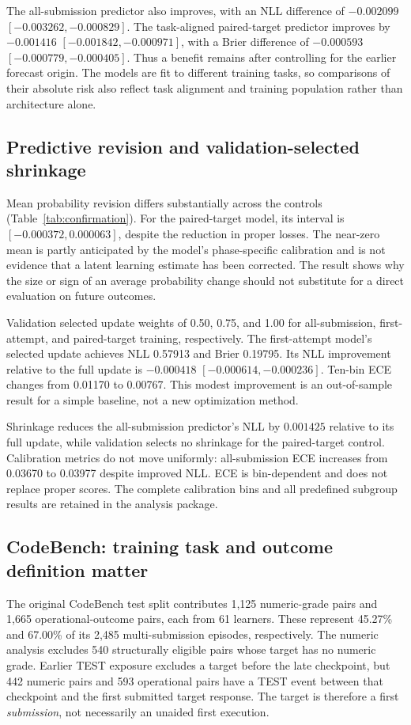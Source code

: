 \documentclass[11pt]{article}
\newcommand{\1}{\mathbb{I}}
\begin{document}
The all-submission predictor also improves, with an NLL difference of $-0.002099$ $[-0.003262,-0.000829]$. The task-aligned paired-target predictor improves by $-0.001416$ $[-0.001842,-0.000971]$, with a Brier difference of $-0.000593$ $[-0.000779,-0.000405]$. Thus a benefit remains after controlling for the earlier forecast origin. The models are fit to different training tasks, so comparisons of their absolute risk also reflect task alignment and training population rather than architecture alone.

\subsection{Predictive revision and validation-selected shrinkage}
Mean probability revision differs substantially across the controls (Table~\ref{tab:confirmation}). For the paired-target model, its interval is $[-0.000372,0.000063]$, despite the reduction in proper losses. The near-zero mean is partly anticipated by the model's phase-specific calibration and is not evidence that a latent learning estimate has been corrected. The result shows why the size or sign of an average probability change should not substitute for a direct evaluation on future outcomes.

Validation selected update weights of 0.50, 0.75, and 1.00 for all-submission, first-attempt, and paired-target training, respectively. The first-attempt model's selected update achieves NLL 0.57913 and Brier 0.19795. Its NLL improvement relative to the full update is $-0.000418$ $[-0.000614,-0.000236]$. Ten-bin ECE changes from 0.01170 to 0.00767. This modest improvement is an out-of-sample result for a simple baseline, not a new optimization method.

Shrinkage reduces the all-submission predictor's NLL by $0.001425$ relative to its full update, while validation selects no shrinkage for the paired-target control. Calibration metrics do not move uniformly: all-submission ECE increases from 0.03670 to 0.03977 despite improved NLL. ECE is bin-dependent and does not replace proper scores. The complete calibration bins and all predefined subgroup results are retained in the analysis package.

\subsection{CodeBench: training task and outcome definition matter}
The original CodeBench test split contributes 1,125 numeric-grade pairs and 1,665 operational-outcome pairs, each from 61 learners. These represent 45.27\% and 67.00\% of its 2,485 multi-submission episodes, respectively. The numeric analysis excludes 540 structurally eligible pairs whose target has no numeric grade. Earlier TEST exposure excludes a target before the late checkpoint, but 442 numeric pairs and 593 operational pairs have a TEST event between that checkpoint and the first submitted target response. The target is therefore a first \emph{submission}, not necessarily an unaided first execution.
\end{document}
